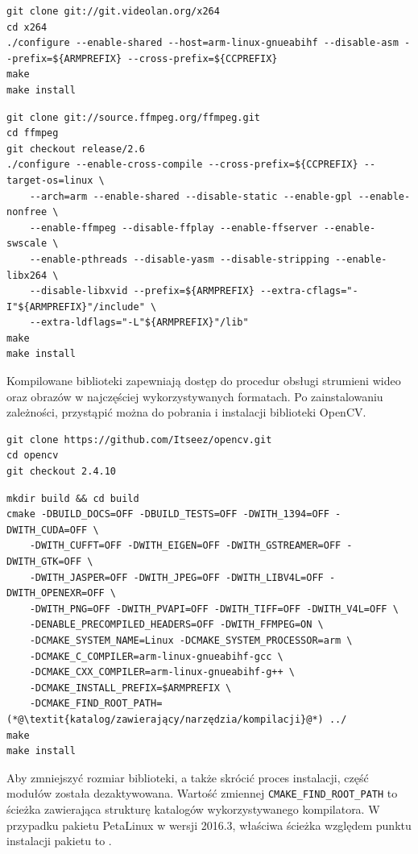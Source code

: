 \begin{lstlisting}[breaklines=true, caption=Kompilacja biblioteki \textit{x264}.]
git clone git://git.videolan.org/x264
cd x264
./configure --enable-shared --host=arm-linux-gnueabihf --disable-asm --prefix=${ARMPREFIX} --cross-prefix=${CCPREFIX}
make
make install
\end{lstlisting}

\begin{lstlisting}[breaklines=true, caption=Kompilacja biblioteki \textit{ffmpeg}.]
git clone git://source.ffmpeg.org/ffmpeg.git
cd ffmpeg
git checkout release/2.6
./configure --enable-cross-compile --cross-prefix=${CCPREFIX} --target-os=linux \
	--arch=arm --enable-shared --disable-static --enable-gpl --enable-nonfree \
	--enable-ffmpeg --disable-ffplay --enable-ffserver --enable-swscale \
	--enable-pthreads --disable-yasm --disable-stripping --enable-libx264 \
	--disable-libxvid --prefix=${ARMPREFIX} --extra-cflags="-I"${ARMPREFIX}"/include" \
	--extra-ldflags="-L"${ARMPREFIX}"/lib"
make
make install
\end{lstlisting}

Kompilowane biblioteki zapewniają dostęp do procedur obsługi strumieni wideo oraz obrazów w najczęściej wykorzystywanych formatach.
Po zainstalowaniu zależności, przystąpić można do pobrania i instalacji biblioteki OpenCV.

\begin{lstlisting}[breaklines=true, caption=Pobieranie biblioteki OpenCV w wersji 2.4.10.]
git clone https://github.com/Itseez/opencv.git
cd opencv
git checkout 2.4.10
\end{lstlisting}

\begin{lstlisting}[breaklines=true, caption=Kompilacja biblioteki \textit{OpenCV}.]
mkdir build && cd build
cmake -DBUILD_DOCS=OFF -DBUILD_TESTS=OFF -DWITH_1394=OFF -DWITH_CUDA=OFF \
	-DWITH_CUFFT=OFF -DWITH_EIGEN=OFF -DWITH_GSTREAMER=OFF -DWITH_GTK=OFF \
	-DWITH_JASPER=OFF -DWITH_JPEG=OFF -DWITH_LIBV4L=OFF -DWITH_OPENEXR=OFF \
	-DWITH_PNG=OFF -DWITH_PVAPI=OFF -DWITH_TIFF=OFF -DWITH_V4L=OFF \
	-DENABLE_PRECOMPILED_HEADERS=OFF -DWITH_FFMPEG=ON \
	-DCMAKE_SYSTEM_NAME=Linux -DCMAKE_SYSTEM_PROCESSOR=arm \
	-DCMAKE_C_COMPILER=arm-linux-gnueabihf-gcc \
	-DCMAKE_CXX_COMPILER=arm-linux-gnueabihf-g++ \
	-DCMAKE_INSTALL_PREFIX=$ARMPREFIX \
	-DCMAKE_FIND_ROOT_PATH=(*@\textit{katalog/zawierający/narzędzia/kompilacji}@*) ../
make
make install
\end{lstlisting}

Aby zmniejszyć rozmiar biblioteki, a także skrócić proces instalacji, część modułów została dezaktywowana. 
Wartość zmiennej \texttt{CMAKE\_FIND\_ROOT\_PATH} to ścieżka zawierająca strukturę katalogów wykorzystywanego kompilatora. 
W przypadku pakietu PetaLinux w wersji 2016.3, właściwa ścieżka względem punktu instalacji pakietu to .

